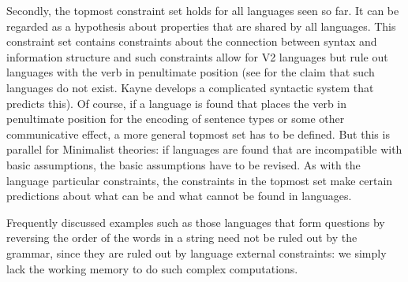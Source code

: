 Secondly, the topmost constraint set holds for all languages seen so far. It can be regarded as a
hypothesis about properties that are shared by all languages. This constraint set contains
constraints about the connection between syntax and information structure and such constraints allow
for V2 languages but rule out languages with the verb in penultimate position (see \citealp[]{Kayne94a-u} for the claim that such languages do not exist. Kayne develops a complicated
syntactic system that predicts this). Of course, if a language is found that places the verb in penultimate
position for the encoding of sentence types or some other communicative effect, a more
general topmost set has to be defined. But this is parallel for Minimalist theories: if languages
are found that are incompatible with basic assumptions, the basic assumptions have to be revised. As
with the language particular constraints, the constraints in the topmost set make certain
predictions about what can be and what cannot be found in languages.

Frequently discussed examples such as those languages that form questions by reversing the order of the words in a
string \citep{MMGRRBW2003a} need not be ruled out by the grammar, since they are ruled out by
language external constraints: we simply lack the working memory to do such complex computations.

